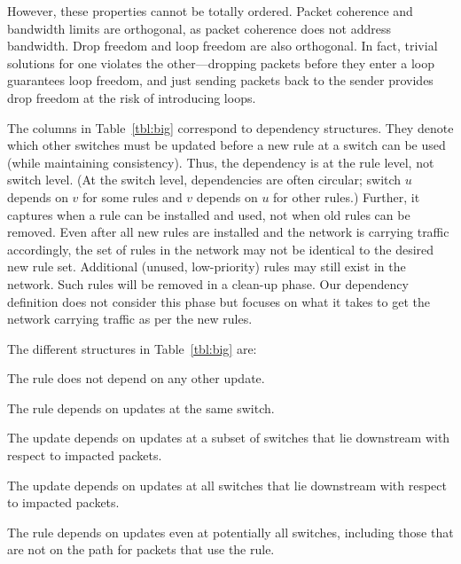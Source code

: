 However, these properties cannot be totally ordered. Packet coherence and bandwidth limits are orthogonal, as packet coherence does not address bandwidth.
Drop freedom and loop freedom are also orthogonal. In fact, trivial solutions for one violates the other---dropping packets before they enter a loop guarantees loop freedom, and just sending packets back to the sender provides drop freedom at the risk of introducing loops.


The columns in Table~\ref{tbl:big} correspond to dependency structures. They denote which other switches must be updated before a new rule at a switch can be used (while maintaining consistency). Thus, the dependency is at the rule level, not switch level. (At the switch level, dependencies are often circular; switch $u$ depends on $v$ for some rules and $v$ depends on $u$ for other rules.) Further, it captures when a rule can be installed and used, not when old rules can be removed. Even after all new rules are installed and the network is carrying traffic accordingly, the set of rules in the network may not be identical to the desired new rule set. Additional (unused, low-priority) rules may still exist in the network. Such rules will be removed in a clean-up phase.
Our dependency definition does not consider this phase but focuses on what it takes to get the network carrying traffic as per the new rules.

The different structures in Table~\ref{tbl:big} are: 

 The rule does not depend on any other update.

 The rule depends on updates at the same switch. 

 The update depends on updates at a subset of switches that lie downstream with respect to impacted packets.

 The update depends on updates at all switches that lie downstream with respect to impacted packets.

 The rule depends on updates even at potentially all switches, including those that are not on the path for packets that use the rule.


